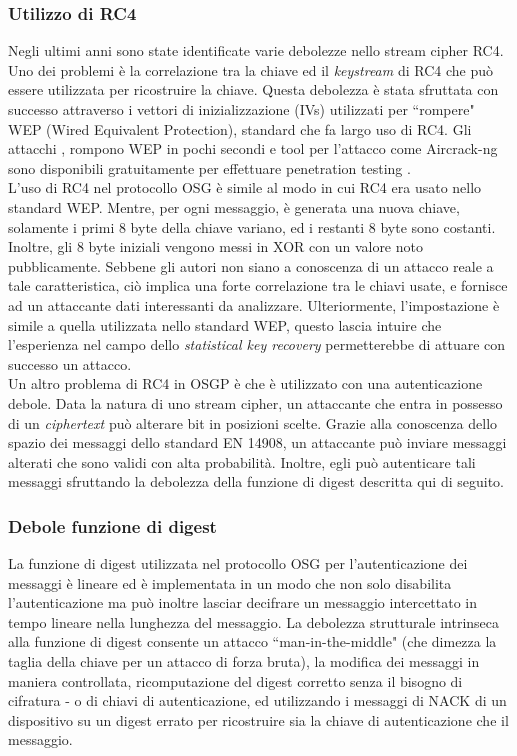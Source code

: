 \subsubsection{Utilizzo di RC4}
Negli ultimi anni sono state identificate varie debolezze nello stream cipher RC4. Uno dei problemi è la correlazione tra la chiave ed il \emph{keystream} di RC4 che può essere utilizzata per ricostruire la chiave. Questa debolezza è stata sfruttata con successo attraverso i vettori di inizializzazione (IVs)  utilizzati per ``rompere" WEP (Wired Equivalent Protection), standard che fa largo uso di RC4. Gli attacchi \cite{wep1}, \cite{wep2} rompono WEP in pochi secondi e tool per l'attacco come Aircrack-ng \cite{aircrackng} sono disponibili gratuitamente per effettuare penetration testing \cite{kali}.\\
L'uso di RC4 nel protocollo OSG è simile al modo in cui RC4 era usato nello standard WEP. Mentre, per ogni messaggio, è generata una nuova chiave, solamente i primi 8 byte della chiave variano, ed i restanti 8 byte sono costanti. Inoltre, gli 8 byte iniziali vengono messi in XOR con un valore noto pubblicamente. Sebbene gli autori non siano a conoscenza di un attacco reale a tale caratteristica, ciò implica una forte correlazione tra le chiavi usate, e fornisce ad un attaccante dati interessanti da analizzare. Ulteriormente, l'impostazione è simile a quella utilizzata nello standard WEP, questo lascia intuire che l'esperienza nel campo dello \emph{statistical key recovery} permetterebbe di attuare con successo un attacco.\\
Un altro problema di RC4 in OSGP è che è utilizzato con una autenticazione debole. Data la natura di uno stream cipher, un attaccante che entra in possesso di un \emph{ciphertext} può alterare bit in posizioni scelte. Grazie alla conoscenza dello spazio dei messaggi dello standard EN 14908, un attaccante può inviare messaggi alterati che sono validi con alta probabilità. Inoltre, egli può autenticare tali messaggi sfruttando la debolezza della funzione di digest descritta qui di seguito.
\subsubsection{Debole funzione di digest}
La funzione di digest utilizzata nel protocollo OSG per l'autenticazione dei messaggi è lineare ed è implementata in un modo che non solo disabilita l'autenticazione ma può inoltre lasciar decifrare un messaggio intercettato in tempo lineare nella lunghezza del messaggio. La debolezza strutturale intrinseca alla funzione di digest consente un attacco ``man-in-the-middle" (che dimezza la taglia della chiave per un attacco di forza bruta), la modifica dei messaggi in maniera controllata, ricomputazione del digest corretto senza il bisogno di cifratura - o di chiavi di autenticazione, ed utilizzando i messaggi di NACK di un dispositivo su un digest errato per ricostruire sia la chiave di autenticazione che il messaggio.
